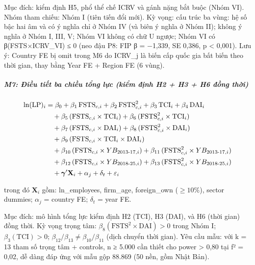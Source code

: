 \documentclass[
  a4paper,
  13pt]{extreport}
\begin{document}
Mục đích: kiểm định H5, phổ thể chế ICRV và gánh nặng bắt buộc (Nhóm
VI). Nhóm tham chiếu: Nhóm I (tiên tiến đổi mới). Kỳ vọng: cấu trúc ba
vùng: hệ số bậc hai âm và có ý nghĩa chỉ ở Nhóm IV (và biên ý nghĩa ở
Nhóm II); không ý nghĩa ở Nhóm I, III, V; Nhóm VI không có chữ U ngược;
Nhóm VI có β(FSTS×ICRV\_VI) ≤ 0 (neo đậu P8: FIP β = −1,339, SE 0,386, p
\textless{} 0,001). Lưu ý: Country FE bị omit trong M6 do ICRV\_j là
biến cấp quốc gia bất biến theo thời gian, thay bằng Year FE + Region FE
(6 vùng).

\hypertarget{m7-ux111iux1ec1u-tiux1ebft-ba-chiux1ec1u-tux1ed5ng-lux1ef1c-kiux1ec3m-ux111ux1ecbnh-h2-h3-h6-ux111ux1ed3ng-thux1eddi}{%
\subparagraph{M7: Điều tiết ba chiều tổng lực (kiểm định H2 + H3 + H6
đồng
thời)}\label{m7-ux111iux1ec1u-tiux1ebft-ba-chiux1ec1u-tux1ed5ng-lux1ef1c-kiux1ec3m-ux111ux1ecbnh-h2-h3-h6-ux111ux1ed3ng-thux1eddi}}

\begin{align}
\ln(\mathrm{LP})_i
  &= \beta_0 + \beta_1\,\mathrm{FSTS}_{c,i} + \beta_2\,\mathrm{FSTS}_{c,i}^{2}
     + \beta_3\,\mathrm{TCI}_i + \beta_4\,\mathrm{DAI}_i \notag \\
  &\quad + \beta_5\,(\mathrm{FSTS}_{c,i} \times \mathrm{TCI}_i)
     + \beta_6\,(\mathrm{FSTS}_{c,i}^{2} \times \mathrm{TCI}_i) \notag \\
  &\quad + \beta_7\,(\mathrm{FSTS}_{c,i} \times \mathrm{DAI}_i)
     + \beta_8\,(\mathrm{FSTS}_{c,i}^{2} \times \mathrm{DAI}_i) \notag \\
  &\quad + \beta_9\,(\mathrm{FSTS}_{c,i} \times \mathrm{TCI}_i \times \mathrm{DAI}_i) \notag \\
  &\quad + \beta_{10}\,(\mathrm{FSTS}_{c,i} \times YB_{2013\text{-}17,i})
     + \beta_{11}\,(\mathrm{FSTS}_{c,i}^{2} \times YB_{2013\text{-}17,i}) \notag \\
  &\quad + \beta_{12}\,(\mathrm{FSTS}_{c,i} \times YB_{2018\text{-}25,i})
     + \beta_{13}\,(\mathrm{FSTS}_{c,i}^{2} \times YB_{2018\text{-}25,i}) \notag \\
  &\quad + \boldsymbol{\gamma}'\mathbf{X}_i + \alpha_j + \delta_t + \varepsilon_i
\label{eq:M7}
\end{align}

trong đó \(\mathbf{X}_i\) gồm: ln\_employees, firm\_age, foreign\_own
(\(\ge 10\%\)), sector dummies; \(\alpha_j\) = country FE; \(\delta_t\)
= year FE.

Mục đích: mô hình tổng lực kiểm định H2 (TCI), H3 (DAI), và H6 (thời
gian) đồng thời. Kỳ vọng trọng tâm:
\(\beta_8(\mathrm{FSTS}^2 \times \mathrm{DAI}) > 0\) trong Nhóm I;
\(\beta_3(\mathrm{TCI}) > 0\);
\(\beta_{12}/\beta_{13} \ne \beta_{10}/\beta_{11}\) (dịch chuyển thời
gian). Yêu cầu mẫu: với k = 13 tham số trọng tâm + controls, n ≥ 5.000
cần thiết cho power \textgreater{} 0,80 tại f² = 0,02, dễ dàng đáp ứng
với mẫu gộp 88.869 (50 nền, gồm Nhật Bản).
\end{document}
